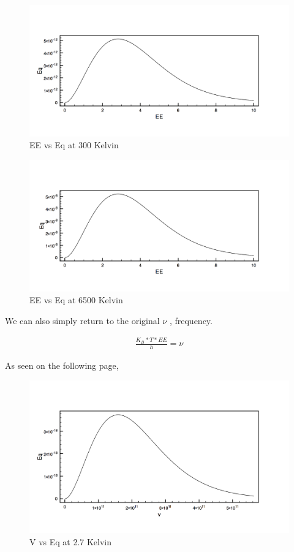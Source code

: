 \documentclass[12pt]{article}
\begin{document}
\begin{figure}[H]
	\centering 
	\includegraphics[width=1.\textwidth]{12.png}
	\caption{EE vs Eq at 300 Kelvin}
\end{figure}

\begin{figure}[H]
	\centering 
	\includegraphics[width=1.\textwidth]{13.png}
	\caption{EE vs Eq at 6500 Kelvin}
\end{figure}

We can also simply return to the original  $\nu$ , frequency. 

\begin{align} 
\frac {K_B*T*EE}{h} = \nu 
\end{align}

As seen on the following page,

\begin{figure}[H]
	\centering 
	\includegraphics[width=1.\textwidth]{21.png}
	\caption{ V vs Eq at 2.7 Kelvin}
\end{figure}
\end{document}
